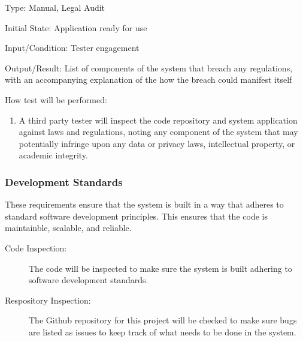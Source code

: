 \documentclass[12pt, titlepage]{article}
\begin{document}
\begin{enumerate}
  Type: Manual, Legal Audit

  Initial State: Application ready for use

  Input/Condition: Tester engagement
  
  Output/Result: List of components of the system that breach any regulations, 
  with an accompanying explanation of the how the breach could manifest itself

  How test will be performed:
  \begin{enumerate}
    \item A third party tester will inspect the code repository and system 
    application against laws and regulations, noting any component of the system 
    that may potentially infringe upon any data or privacy laws, intellectual 
    property, or academic integrity.
  \end{enumerate}
\end{enumerate}

\subsubsection{Development Standards}
These requirements ensure that the system is built in a way that adheres to
standard software development principles. This ensures that the code is
maintainble, scalable, and reliable.

\begin{description}
  \item[Code Inspection:] The code will be inspected to make sure the system is
  built adhering to software development standards.
  \item[Respository Inspection:] The Github repository for this project will be
  checked to make sure bugs are listed as issues to keep track of what needs to
  be done in the system.
\end{description}
\end{document}

